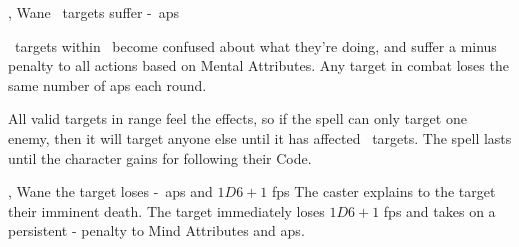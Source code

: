   {\mWater, \mFate}%
  {Wane}%
  {\duplicated}%
  {}%
  {\spellArea\ targets suffer -~\glspl{ap}}%
  {
    \spellArea\ targets within \spellRange\ become confused about what they're doing, and suffer a minus  penalty to all actions based on Mental Attributes.
    Any target in combat loses the same number of \glspl{ap} each round.

    All valid targets in range feel the effects, so if the spell can only target one enemy, then it will target anyone else until it has affected \spellArea\ targets.
    The spell lasts until the character gains  for following their Code.
  }

  {\mWater, \mFate}%
  {Wane}%
  {\divergent}%
  {}%
  {the target loses -~\glspl{ap} and $1D6 + 1$ \glspl{fp}}%
  {
    The caster explains to the target their imminent death.
    The target immediately loses $1D6+1$ \glspl{fp} and takes on a persistent - penalty to Mind Attributes and \glspl{ap}.
  }
